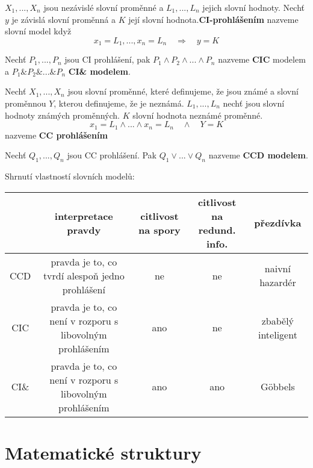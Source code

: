 \begin{definition}
$X_1,...,X_n$ jsou nezávislé slovní proměnné a $L_1,...,L_n$ jejich slovní hodnoty. Nechť $y$ je závislá slovní proměnná a $K$ její slovní hodnota.\textbf{CI-prohlášením} nazveme slovní model když $$x_1=L_1,...,x_n=L_n \quad \Longrightarrow \quad y=K$$
\end{definition}

\begin{definition}
Nechť $P_1,...,P_n$ jsou CI prohlášení, pak $P_1\wedge P_2\wedge...\wedge P_n$ nazveme \textbf{CIC} modelem a $P_1 \& P_2 \&... \& P_n$ \textbf{CI\& modelem}.
\end{definition}

\begin{definition}
Nechť $X_1,...,X_n$ jsou slovní proměnné, které definujeme, že jsou známé a slovní proměnnou $Y$, kterou definujeme, že je neznámá. $L_1,...,L_n$ nechť jsou slovní hodnoty známých proměnných. $K$ slovní hodnota neznámé proměnné. $$x_1=L_1\wedge...\wedge x_n=L_n \quad \wedge \quad Y=K$$ nazveme \textbf{CC prohlášením}
\end{definition}

\begin{definition}
Nechť $Q_1,...,Q_n$ jsou CC prohlášení. Pak $Q_1 \vee...\vee Q_n$ nazveme \textbf{CCD modelem}.
\end{definition}

Shrnutí vlastností slovních modelů:
\begin{center}
 \begin{tabular}{|| c ||c c c c||} 
 \hline
  & interpretace pravdy & citlivost na spory & citlivost na redund. info. & přezdívka \\ [0.5ex] 
 \hline\hline
 CCD & pravda je to, co tvrdí alespoň jedno prohlášení & ne & ne & naivní hazardér \\ 
 \hline
 CIC & pravda je to, co není v rozporu s libovolným prohlášením & ano & ne & zbabělý inteligent \\
 \hline
 CI\& & pravda je to, co není v rozporu s libovolným prohlášením & ano & ano & Göbbels \\ [1ex] 
 \hline
 \end{tabular}
\end{center}

\section{Matematické struktury}
